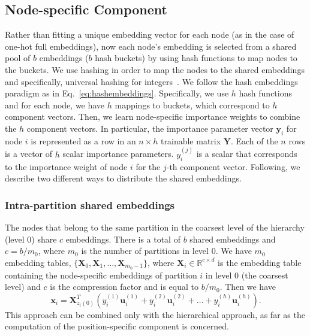 \documentclass[conference]{IEEEtran}
\begin{document}
\subsection{Node-specific Component}
\label{sec:node-specific}
Rather than fitting a unique embedding vector for each node (as in the case of one-hot full embeddings), now each node's embedding is selected from a shared pool of $b$ embeddings ($b$ hash buckets) by using hash functions to map nodes to the buckets.    
% 
We use hashing in order to map the nodes to the shared embeddings and specifically, universal hashing for integers~\cite{carter1979universal}. We follow the hash embeddings~\cite{svenstrup2017hash} paradigm as in Eq.~\ref{eq:hashembeddings}. Specifically, we use $h$ hash functions and for each node, we have $h$ mappings to buckets, which correspond to $h$ component vectors. Then, we learn node-specific importance weights to combine the $h$ component vectors. In particular, the importance parameter vector $\mathbf{y}_i$ for node $i$ is represented as a row in an $n \times h$ trainable matrix $\mathbf{Y}$. Each of the $n$ rows is a vector of $h$ scalar importance parameters. 
$y_i^{(j)}$ is a scalar that corresponds to the importance weight of node $i$ for the $j$-th component vector.
% 
Following, we describe two different ways to distribute the shared embeddings.
% 
\subsubsection{Intra-partition shared embeddings}
The nodes that belong to the same partition in the coarsest level of the hierarchy (level $0$) share $c$ embeddings. There is a total of $b$ shared embeddings and $c=b/m_0$, where $m_0$ is the number of partitions in level 0.
We have $m_0$ embedding tables, $\{\mathbf{X}_0, \mathbf{X}_1, \dots, \mathbf{X}_{m_0-1} \}$, where $\mathbf{X}_i \in \mathbb{R}^{c \times d}$ is the embedding table containing the node-specific embeddings of partition $i$ in level $0$ (the coarsest level) and $c$ is the compression factor and is equal to $b/m_0$. 
% 
Then we have
%
% 
\begin{equation}
\label{xi_intra}
    \mathbf{x}_i = \mathbf{X}_{z_i(0)}^T(y^{(1)}_i \mathbf{u}_i^{(1)} + y^{(2)}_i \mathbf{u}_i^{(2)}+\dots + y^{(h)}_i \mathbf{u}_i^{(h)}).
\end{equation}
This approach can be combined only with the hierarchical approach, as far as the computation of the position-specific component is concerned.
\end{document}
